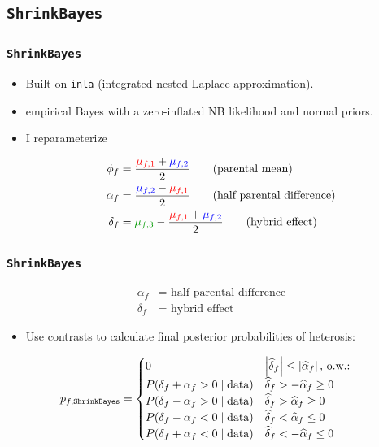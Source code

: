 \documentclass[handout]{beamer}
\providecommand{\wh}[1]{\widehat{#1}}
\numberwithin{equation}{section}
\begin{document}
\subsection{{\tt ShrinkBayes}}

\begin{frame}
\frametitle{{\tt ShrinkBayes}}
\begin{itemize}
\item Built on {\tt inla} (integrated nested Laplace approximation).
\pause \item empirical Bayes with a zero-inflated NB likelihood and normal priors.
\pause \item I reparameterize

\begin{align*}
\phi_f &= \frac{{\color{red}\mu_{f, 1}} + {\color{blue}\mu_{f, 2}}}{2} \qquad \text{(parental mean)} \\
\alpha_f &= \frac{{\color{blue}\mu_{f, 2}} - {\color{red}\mu_{f, 1}}}{2} \qquad \text{(half parental difference)} \\
\delta_f &= {\color{dkgreen}\mu_{f, 3}} - \frac{{\color{red}\mu_{f, 1}} + {\color{blue}\mu_{f, 2}}}{2} \qquad \text{(hybrid effect)} 
\end{align*}
\end{itemize}
\end{frame}

\begin{frame}
\frametitle{{\tt ShrinkBayes}}

\begin{align*}
\alpha_f &= \text{ half parental difference} \\
\delta_f &= \text{ hybrid effect}
\end{align*}

\begin{itemize}
\item Use contrasts to calculate final posterior probabilities of heterosis:

\end{itemize}


\begin{align*}
p_{f, \text{\tt ShrinkBayes}} &= \begin{cases}
0 & \left |\wh{\delta}_f  \right | \le \left | \wh{\alpha}_f  \right | \text{, o.w.:} \\
P(\delta_f + \alpha_f > 0 \mid \text{data}) & \wh{\delta}_f > -\wh{\alpha}_f \ge 0 \\
P(\delta_f - \alpha_f > 0 \mid \text{data}) & \wh{\delta}_f > \wh{\alpha}_f \ge 0 \\
P(\delta_f - \alpha_f < 0 \mid \text{data}) & \wh{\delta}_f < \wh{\alpha}_f \le 0 \\
P(\delta_f + \alpha_f < 0 \mid \text{data}) & \wh{\delta}_f < -\wh{\alpha}_f \le 0
\end{cases}
\end{align*}
\end{frame}
\end{document}
